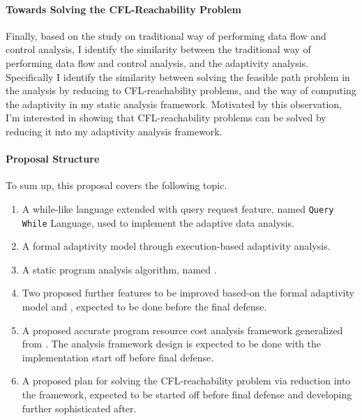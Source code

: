    \paragraph*{Towards Solving the CFL-Reachability Problem}
Finally, based on the study on traditional way of performing data flow and control analysis,
I identify the similarity between the traditional way of performing data flow and control analysis, and the 
   adaptivity analysis.  
   Specifically I identify the similarity between 
   solving the feasible path problem in the analysis by reducing to CFL-reachability problems,
   and the way of computing the adaptivity in my static analysis framework.
   Motivated by this observation, 
   I'm interested in showing that
   CFL-reachability problems can be solved by reducing it into my adaptivity analysis framework.


\paragraph*{Proposal Structure}
To sum up, this proposal covers the following topic.
\begin{enumerate}
\item A while-like language extended with query request feature, named {\tt Query While} Language, 
used to implement 
the adaptive data analysis.
\item A formal adaptivity model through execution-based adaptivity analysis.
\item A static program analysis algorithm, named {\THESYSTEM}.
\item Two proposed further features to be improved based-on the formal adaptivity model and {\THESYSTEM},
 expected to be done before the final defense.
\item A proposed accurate program resource cost analysis framework generalized from {\THESYSTEM}. 
The analysis framework design is expected to be done with the implementation start off before final defense.
\item A proposed plan for solving the CFL-reachability problem via reduction into the {\THESYSTEM} framework,
expected to be started off before final defense and developing further sophisticated after.
\end{enumerate}